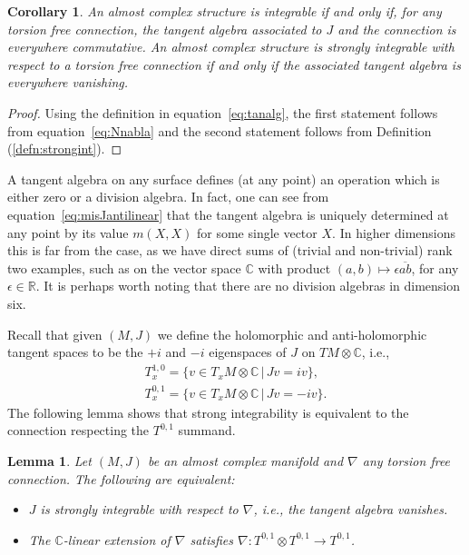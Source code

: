 \documentclass[10pt,a4paper]{amsart}
\newtheorem{cor}[thm]{Corollary}
\newtheorem{lem}[thm]{Lemma}
\numberwithin{equation}{section}
\newcommand{\R}{\mathbb{R}}
\newcommand{\CC}{\mathbb{C}}
\begin{document}
\begin{cor} \label{cor:Jintcomm}
 An almost complex structure is integrable if and only if, for any torsion free connection, the tangent algebra associated to $J$ and the connection is \emph{everywhere commutative}. An almost complex structure is strongly integrable with respect to a torsion free connection if and only if the associated tangent algebra is \emph{everywhere vanishing}.
 \end{cor}

 \begin{proof}Using the definition in equation~\eqref{eq:tanalg}, the first statement follows from equation~\eqref{eq:Nnabla} and the second
statement follows from Definition (\ref{defn:strongint}).
 \end{proof}

\begin{rmk}A tangent algebra on any surface defines (at any point) an operation which is either zero or a division algebra. In fact, one can see from equation~\eqref{eq:misJantilinear} that the tangent algebra is uniquely determined at any point by its value $m(X,X)$ for some single vector $X$. In higher dimensions this is far from the case, as we have direct sums of (trivial and non-trivial) rank two examples, such as on the vector space $\CC$ with product $(a,b) \mapsto \epsilon \overline{ab}$, for any $\epsilon \in \R$. It is perhaps worth noting that there are no division algebras in dimension six.
\end{rmk}

Recall that given $(M,J)$ we define the holomorphic and anti-holomorphic tangent spaces to be the $+i$ and $-i$ eigenspaces of $J$ on $TM \otimes \CC$, i.e.,
\begin{gather*}
T^{1,0}_x = \{ v \in T_xM \otimes \CC \,| \, Jv = i v\}, \\
T^{0,1}_x = \{ v \in T_xM \otimes \CC\, | \, Jv = - i v\}.
\end{gather*}
The following lemma shows that strong integrability is equivalent to the connection respecting the $T^{0,1}$ summand.

\begin{lem} \label{lem:strongintequiv}
Let $(M,J)$ be an almost complex manifold and $\nabla$ any torsion free connection. The following are equivalent:
\begin{itemize}\itemsep=0pt
\item $J$ is strongly integrable with respect to $\nabla$, i.e., the tangent algebra vanishes.
\item The $\CC$-linear extension of $\nabla$ satisfies $\nabla\colon T^{0,1} \otimes T^{0,1} \to T^{0,1}$.
\end{itemize}
\end{lem}
\end{document}
